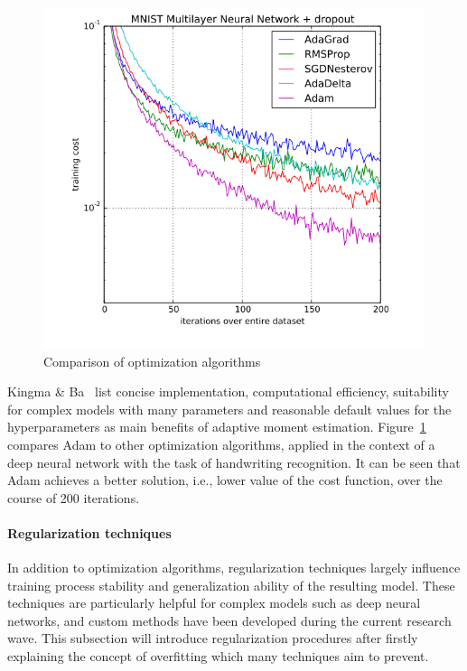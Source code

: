 \begin{figure}[h]
  \centering
  \includegraphics[height=10cm]{img/adam_comparison}
  \caption[Comparison of optimization algorithms]{Comparison of optimization algorithms~\cite{Kingma2014a}}
\label{fig:adam_comp}
\end{figure}

Kingma \& Ba~\cite{Kingma2014a} list concise implementation, computational efficiency,
suitability for complex models with many parameters and reasonable default values
for the hyperparameters as main benefits of adaptive moment estimation.
Figure~\ref{fig:adam_comp} compares Adam to other optimization algorithms,
applied in the context of a deep neural network with the task of handwriting
recognition.
It can be seen that Adam achieves a better solution, i.e., lower value of the
cost function, over the course of 200 iterations.

\paragraph{Regularization techniques}
\label{sub:dl_regularization}

In addition to optimization algorithms, regularization techniques largely
influence training process stability and generalization ability of the
resulting model.
These techniques are particularly helpful for complex models such as deep
neural networks, and custom methods have been developed during the current
research wave.
This subsection will introduce regularization procedures after firstly explaining
the concept of overfitting which many techniques aim to prevent.

